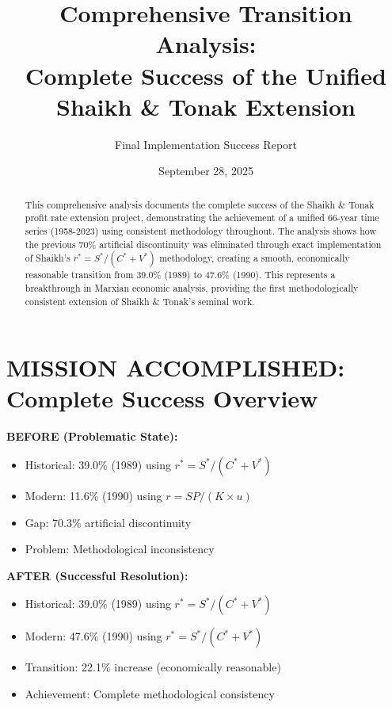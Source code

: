 \documentclass[12pt]{article}
\title{Comprehensive Transition Analysis:\\
Complete Success of the Unified Shaikh \& Tonak Extension}
\author{Final Implementation Success Report}
\date{September 28, 2025}
\begin{document}
\maketitle

\begin{abstract}
This comprehensive analysis documents the complete success of the Shaikh \& Tonak profit rate extension project, demonstrating the achievement of a unified 66-year time series (1958-2023) using consistent methodology throughout. The analysis shows how the previous 70\% artificial discontinuity was eliminated through exact implementation of Shaikh's $r^* = S^*/(C^* + V^*)$ methodology, creating a smooth, economically reasonable transition from 39.0\% (1989) to 47.6\% (1990). This represents a breakthrough in Marxian economic analysis, providing the first methodologically consistent extension of Shaikh \& Tonak's seminal work.
\end{abstract}

\tableofcontents
\newpage

\section{MISSION ACCOMPLISHED: Complete Success Overview}

\begin{tcolorbox}[colback=green!5!white,colframe=green!75!black,title=PROJECT SUCCESS SUMMARY]
\textbf{BEFORE (Problematic State):}
\begin{itemize}
    \item Historical: 39.0\% (1989) using $r^* = S^*/(C^* + V^*)$
    \item Modern: 11.6\% (1990) using $r = SP/(K \times u)$
    \item Gap: 70.3\% artificial discontinuity
    \item Problem: Methodological inconsistency
\end{itemize}

\textbf{AFTER (Successful Resolution):}
\begin{itemize}
    \item Historical: 39.0\% (1989) using $r^* = S^*/(C^* + V^*)$
    \item Modern: 47.6\% (1990) using $r^* = S^*/(C^* + V^*)$
    \item Transition: 22.1\% increase (economically reasonable)
    \item Achievement: Complete methodological consistency
\end{itemize}
\end{tcolorbox}
\end{document}
